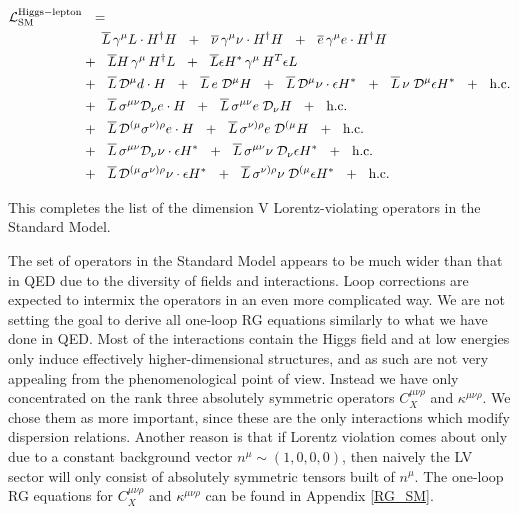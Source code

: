 \documentclass[12pt]{revtex4}
\newcommand{\ov}{\overline}
\newcommand{\md}{\mathcal{D}}
\begin{document}
\begin{align}
\notag
	\mathcal{L}_{\rm SM}^{\rm Higgs-lepton} & ~~=~~
	\\
\notag
	&
	\phantom{+~~}
	\ov{L}\, \gamma^\mu L \cdot H^\dag H ~~+~~
	\ov{\nu}\, \gamma^\mu \nu \cdot H^\dag H ~~+~~
	\ov{e}\, \gamma^\mu e \cdot H^\dag H 
	\\
\notag
	&
	+~~
	\ov{L}H \, \gamma^\mu\, H^\dag L ~~+~~
	\ov{L}\epsilon H^* \, \gamma^\mu \, H^T \epsilon L 
	\\
\notag
	&
	+~~
	\ov{L}\, \md^\mu d\cdot H ~~+~~
	\ov{L}\, e \; \md^\mu H ~~+~~
	\ov{L}\, \md^\mu \nu \cdot \epsilon H^* ~~+~~
	\ov{L}\, \nu \; \md^\mu \epsilon H^* ~~+~~
	\text{h.c.}
	\\
\notag
	&
	+~~
	\ov{L}\, \sigma^{\mu\nu} \md_\nu e \cdot H ~~+~~
	\ov{L}\, \sigma^{\mu\nu} e\; \md_\nu H ~~+~~
	\text{h.c.}
	\\
\notag
	&
	+~~
	\ov{L}\, \md^{(\mu} \sigma^{\nu)\rho} e \cdot H ~~+~~
	\ov{L}\, \sigma^{\nu)\rho} e \; \md^{(\mu} H ~~+~~
	\text{h.c.}
	\\
\notag
	&
	+~~
	\ov{L}\, \sigma^{\mu\nu} \md_\nu \nu \cdot \epsilon H^* ~~+~~
	\ov{L}\, \sigma^{\mu\nu} \nu\; \md_\nu \epsilon H^* ~~+~~
	\text{h.c.}
	\\
\notag
	&
	+~~
	\ov{L}\, \md^{(\mu} \sigma^{\nu)\rho} \nu \cdot \epsilon H^* ~~+~~
	\ov{L}\, \sigma^{\nu)\rho} \nu \; \md^{(\mu} \epsilon H^* ~~+~~
	\text{h.c.}
\end{align}

	This completes the list of the dimension V Lorentz-violating
	operators in the Standard Model.

	The set of operators in the Standard Model appears to be much
	wider than that in QED due to the diversity of fields and interactions.
	Loop corrections are expected to intermix the operators in an 
	even more complicated way.
	We are not setting the goal to derive all one-loop RG
	equations similarly to what we have done in QED.
	Most of the interactions contain the Higgs field and at low
	energies only induce effectively higher-dimensional structures,
	and as such are not very appealing from the phenomenological point of
	view.
	Instead we have only concentrated on the rank three absolutely
	symmetric operators $ C_X^{\mu\nu\rho} $ 
	and $ \kappa^{\mu\nu\rho} $.
	We chose them as more important, since these are the only interactions
	which modify dispersion relations.
	Another reason is that if Lorentz violation comes about only 
	due to a constant background vector $ n^{\mu} \sim (1, 0, 0, 0) $,
	then naively the LV sector will only consist of absolutely symmetric
	tensors built of $ n^\mu $.
	The one-loop RG equations for $ C_X^{\mu\nu\rho} $ 
	and $ \kappa^{\mu\nu\rho} $ can be found in Appendix \ref{RG_SM}.
\end{document}

